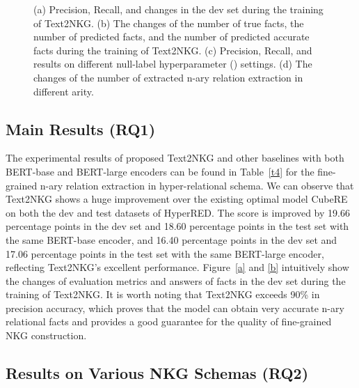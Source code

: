 \documentclass{article} \usepackage{iclr2024_conference,times}
\begin{document}
\begin{figure*}[h!t]
    \centering
	\caption{(a) Precision, Recall, and  changes in the dev set during the training of Text2NKG. (b) The changes of the number of true facts, the number of predicted facts, and the number of predicted accurate facts during the training of Text2NKG. (c) Precision, Recall, and  results on different null-label hyperparameter () settings. (d) The changes of the number of extracted n-ary
  relation extraction in different arity.}
	\label{f3}
\end{figure*}



\subsection{Main Results (RQ1)}

The experimental results of proposed Text2NKG and other baselines with both BERT-base and BERT-large encoders can be found in Table~\ref{t4} for the fine-grained n-ary relation extraction in hyper-relational schema. We can observe that Text2NKG shows a huge improvement over the existing optimal model CubeRE on both the dev and test datasets of HyperRED. The  score is improved by 19.66 percentage points in the dev set and 18.60 percentage points in the test set with the same BERT-base encoder, and 16.40 percentage points in the dev set and 17.06 percentage points in the test set with the same BERT-large encoder, reflecting Text2NKG's excellent performance. Figure~\ref{a} and \ref{b} intuitively show the changes of evaluation metrics and answers of facts in the dev set during the training of Text2NKG. It is worth noting that Text2NKG exceeds 90\% in precision accuracy, which proves that the model can obtain very accurate n-ary relational facts and provides a good guarantee for the quality of fine-grained NKG construction.

\subsection{Results on Various NKG Schemas (RQ2)}
\end{document}
